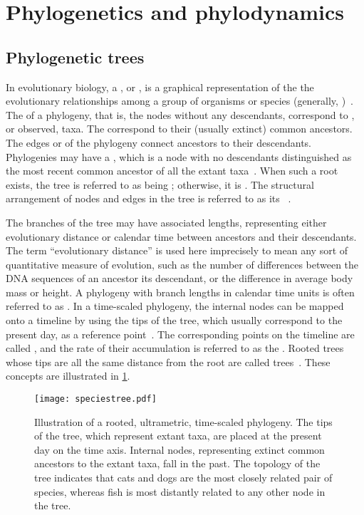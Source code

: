 \section{Phylogenetics and phylodynamics}
\label{sec:phylo}

\subsection{Phylogenetic trees}

In evolutionary biology, a , or , is a
graphical representation of the the evolutionary relationships among a group of
organisms or species (generally, )~\autocite{haeckel1866generelle}.
The  of a phylogeny, that is, the nodes without any descendants,
correspond to , or observed, taxa. The 
correspond to their (usually extinct) common ancestors. The edges or
 of the phylogeny connect ancestors to their descendants.
Phylogenies may have a , which is a node with no descendants
distinguished as the most recent common ancestor of all the extant
taxa~\autocite{harding1971probabilities}. When such a root exists, the tree is
referred to as being ; otherwise, it is . The
structural arrangement of nodes and edges in the tree is referred to as its
~\autocite{cavalli1967phylogenetic}. 

The branches of the tree may have associated lengths, representing either
evolutionary distance or calendar time between ancestors and their descendants.
The term ``evolutionary distance'' is used here imprecisely to mean any sort of
quantitative measure of evolution, such as the number of differences between
the DNA sequences of an ancestor its descendant, or the difference in average
body mass or height. A phylogeny with branch lengths in calendar time units is
often referred to as . In a time-scaled phylogeny, the
internal nodes can be mapped onto a timeline by using the tips of the tree,
which usually correspond to the present day, as a reference
point~\autocite{nee1992tempo}. The corresponding points on the timeline are
called , and the rate of their accumulation is referred
to as the . Rooted trees whose tips are all the same
distance from the root are called 
trees~\autocite{buneman1974note}. These concepts are illustrated in
\cref{fig:speciestree}.

\begin{figure}[ht]
  \centering
  \texttt{[image: speciestree.pdf]}
  \caption[Illustration of a rooted, ultrametric, time-scaled phylogeny]
    {Illustration of a rooted, ultrametric, time-scaled phylogeny. The tips of
      the tree, which represent extant taxa, are placed at the present day on
      the time axis. Internal nodes, representing extinct common ancestors to
      the extant taxa, fall in the past. The topology of the tree indicates
      that cats and dogs are the most closely related pair of species, whereas
      fish is most distantly related to any other node in the tree.}
  \label{fig:speciestree}
\end{figure}

